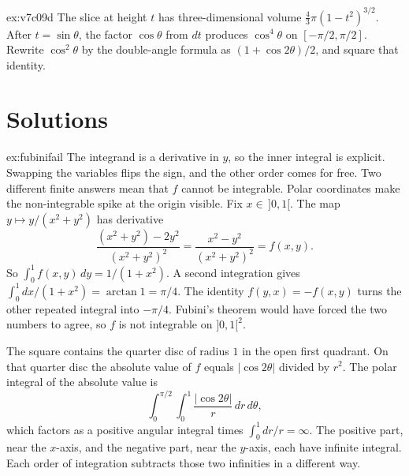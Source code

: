 \begin{hint}{ex:v7c09d}
The slice at height $t$ has three-dimensional volume $\frac43\pi(1-t^2)^{3/2}$. After $t=\sin\theta$, the factor $\cos\theta$ from $dt$ produces $\cos^4\theta$ on $[-\pi/2,\pi/2]$. Rewrite $\cos^2\theta$ by the double-angle formula as $(1+\cos 2\theta)/2$, and square that identity.
\end{hint}

\section{Solutions}

\begin{solution}{ex:fubinifail}
\idea The integrand is a derivative in $y$, so the inner integral is explicit. Swapping the variables flips the sign, and the other order comes for free. Two different finite answers mean that $f$ cannot be integrable. Polar coordinates make the non-integrable spike at the origin visible.
\writeup Fix $x\in\,]0,1[$. The map $y\mapsto y/(x^2+y^2)$ has derivative
\[
\frac{(x^2+y^2)-2y^2}{(x^2+y^2)^2}=\frac{x^2-y^2}{(x^2+y^2)^2}=f(x,y).
\]
So $\int_0^1 f(x,y)\,dy=1/(1+x^2)$. A second integration gives $\int_0^1 dx/(1+x^2)=\arctan 1=\pi/4$. The identity $f(y,x)=-f(x,y)$ turns the other repeated integral into $-\pi/4$. Fubini's theorem would have forced the two numbers to agree, so $f$ is not integrable on $]0,1[^2$.

The square contains the quarter disc of radius $1$ in the open first quadrant. On that quarter disc the absolute value of $f$ equals $|\cos 2\theta|$ divided by $r^2$. The polar integral of the absolute value is
\[
\int_0^{\pi/2}\!\!\int_0^1\frac{|\cos 2\theta|}{r}\,dr\,d\theta,
\]
which factors as a positive angular integral times $\int_0^1 dr/r=\infty$. The positive part, near the $x$-axis, and the negative part, near the $y$-axis, each have infinite integral. Each order of integration subtracts those two infinities in a different way.
\end{solution}

